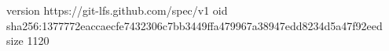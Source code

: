 version https://git-lfs.github.com/spec/v1
oid sha256:1377772eaccaecfe7432306c7bb3449ffa479967a38947edd8234d5a47f92eed
size 1120
